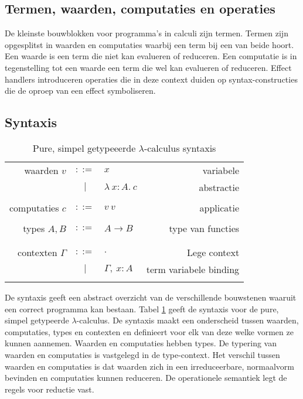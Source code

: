 \subsection{Termen, waarden, computaties en operaties}
De kleinste bouwblokken voor programma's in calculi zijn termen. Termen zijn opgesplitst in waarden en computaties waarbij een term bij een van beide hoort. Een waarde is een term die niet kan evalueren of reduceren. Een computatie is in tegenstelling tot een waarde een term die wel kan evalueren of reduceren. Effect handlers introduceren operaties die in deze context duiden op syntax-constructies die de oproep van een effect symboliseren.

\subsection{Syntaxis}
\begin{table}
    \centering
    \begin{tabular}{|r c l r|}
    \hline 
         waarden $v$ & $::=$ & $x$ & variabele \\
         & $|$ & $\lambda\:x:A.\:c$ & abstractie \\
         & & & \\
         computaties $c$ & $::=$ & $v\:v$ & applicatie \\
         & & & \\
        types $A, B$ & $::=$ & $A \rightarrow B$ & type van functies \\
         & & & \\
         \\
         contexten $\Gamma$ & $::=$ & $.$ & Lege context \\
         & $|$ & $\Gamma,\:x:A$ & term variabele binding \\
    \\
    \hline
    \end{tabular}
    \caption{Pure, simpel getypeeerde $\lambda$-calculus syntaxis}
    \label{fig:syntaxisSTLC}
\end{table}

De syntaxis geeft een abstract overzicht van de verschillende bouwstenen waaruit een correct programma kan bestaan. Tabel \ref{fig:syntaxisSTLC} geeft de syntaxis voor de pure, simpel getypeerde $\lambda$-calculus. De syntaxis maakt een onderscheid tussen waarden, computaties, types en contexten en definieert voor elk van deze welke vormen ze kunnen aannemen. Waarden en computaties hebben types. De typering van waarden en computaties is vastgelegd in de type-context. Het verschil tussen waarden en computaties is dat waarden zich in een irreduceerbare, normaalvorm bevinden en computaties kunnen reduceren. De operationele semantiek legt de regels voor reductie vast.

